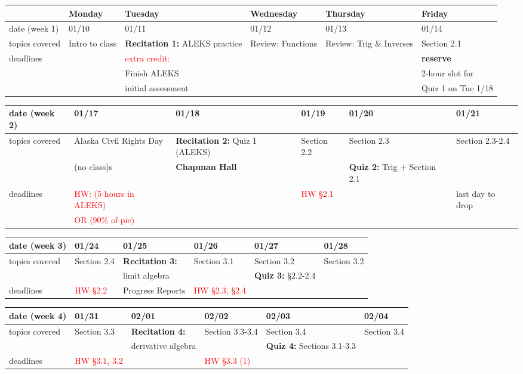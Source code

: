 \documentclass[11pt,fleqn]{article}
\begin{document}
\begin{tabularx}{\textwidth}{|X|| X | X | X | X | X |}
\hline
&Monday & Tuesday & Wednesday & Thursday & Friday \\
\hline \hline
\rowcolor{gray!20} 
date (week 1)&01/10&01/11&01/12&01/13&01/14\\
\hline
topics covered&Intro to class& \textbf{Recitation 1:} ALEKS practice&  Review: Functions & Review:  Trig \& Inverses&Section 2.1\\
\hline
deadlines&&\textcolor{red}{extra credit:} &&&\textbf{reserve}\\
&&Finish ALEKS&&&2-hour slot for\\
&& initial assessment &&& Quiz 1 on Tue 1/18\\
\hline 
\end{tabularx}
\vfill
\begin{tabularx}{\textwidth}{|X|| X | X | X | X | X |}
\hline
\rowcolor{gray!20}
date (week 2)&01/17&01/18&01/19&01/20&01/21\\ \hline
topics covered &Alaska Civil Rights Day&\textbf{Recitation 2:} Quiz 1 (ALEKS)& Section 2.2 &Section 2.3&Section 2.3-2.4\\ 
&(no class)s&\textbf{\textcolor{ddgreen}{Chapman Hall}}&&\textbf{Quiz 2:} Trig + Section 2.1&\\ \hline
deadlines&\textcolor{red}{HW: (5 hours in ALEKS)}&&\textcolor{red}{HW \S 2.1}&&\textcolor{ddgreen}{last day to drop}\\ 
& \textcolor{red}{ OR (90\% of pie)}&&&& \\
 \hline 
 \end{tabularx}
 \vfill
\begin{tabularx}{\textwidth}{|X|| X | X | X | X | X |}
\hline
\rowcolor{gray!20}
date (week 3)&01/24&01/25&01/26&01/27&01/28\\ \hline
topics covered&Section 2.4&\textbf{Recitation 3:} &Section 3.1 &Section 3.2&Section 3.2\\
&&limit algebra&&\textbf{Quiz 3:} \S 2.2-2.4&\\ \hline
deadlines& \textcolor{red}{HW \S 2.2}& \textcolor{ddgreen}{Progress Reports}&\textcolor{red}{HW \S 2.3, \S 2.4}&& \\ \hline
\end{tabularx}
\vfill
\begin{tabularx}{\textwidth}{|X|| X | X | X | X | X |}
\hline
\rowcolor{gray!20}
date (week 4)&01/31&02/01&02/02&02/03&02/04\\ \hline
topics covered&Section 3.3&\textbf{Recitation 4:}&Section 3.3-3.4&Section 3.4&Section 3.4\\ 
&&derivative algebra&&\textbf{Quiz 4:} Sections 3.1-3.3& \\ \hline
deadlines&\textcolor{red}{HW \S 3.1, 3.2}& &\textcolor{red}{HW \S 3.3 (1)}&& \\ \hline 
\end{tabularx}
\end{document}
